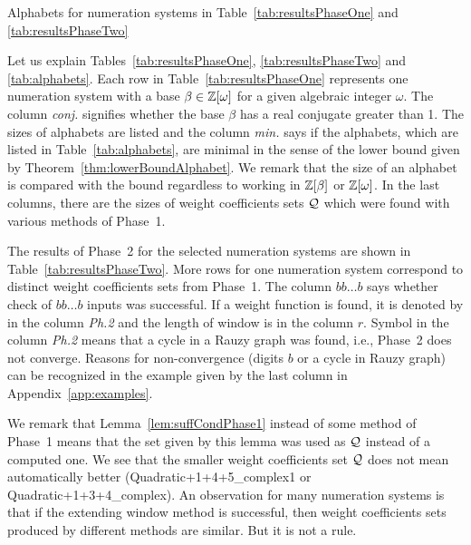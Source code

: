 \begin{table}[htb]
	\begin{center}
	
	\end{center}
\caption{Alphabets for numeration systems in Table~\ref{tab:resultsPhaseOne} and \ref{tab:resultsPhaseTwo}}
\label{tab:alphabets}
\end{table}





Let us explain Tables~\ref{tab:resultsPhaseOne}, \ref{tab:resultsPhaseTwo} and \ref{tab:alphabets}. Each row in Table~\ref{tab:resultsPhaseOne} represents one numeration system with a base $\beta\in\mathbb{Z}[\omega]$ for a given algebraic integer $\omega$. The column \emph{conj.} signifies whether the base $\beta$ has a real conjugate greater than 1. The sizes of alphabets are listed and the column \emph{min.} says if the alphabets, which are listed in Table~\ref{tab:alphabets}, are minimal in the sense of the lower bound given by Theorem~\ref{thm:lowerBoundAlphabet}.  We remark that the size of an alphabet is compared with the bound regardless to working in $\mathbb{Z}[\beta]$ or $\mathbb{Z}[\omega]$. 
In the last columns, there are the sizes of weight coefficients sets $\mathcal{Q}$ which were found  with various methods of Phase~1.

The results of Phase~2 for the selected numeration systems are shown in Table~\ref{tab:resultsPhaseTwo}. More rows for one numeration system correspond to distinct weight coefficients sets from Phase~1. The column $bb\dots b$ says whether check of $bb\dots b$ inputs was successful. If a weight function is found, it is denoted by \checkmark{} in the column \emph{Ph.2} and the length of window is in the column $r$. Symbol \xmark{} in the column \emph{Ph.2} means that a cycle in a Rauzy graph was found, i.e., Phase~2 does not converge. Reasons for non-convergence (digits $b$ or a cycle in Rauzy graph) can be recognized in the  example given by the last column in Appendix~\ref{app:examples}.

We remark that Lemma~\ref{lem:suffCondPhase1} instead of some method of Phase~1 means that the set given by this lemma was used as $\mathcal{Q}$ instead of a computed one.  We see that the smaller weight coefficients set $\mathcal{Q}$ does not mean automatically better (Quadratic+1+4+5\_complex1 or Quadratic+1+3+4\_complex). An observation for many numeration systems is that if the extending window method is successful, then weight coefficients sets produced by different methods are similar. But it is not a rule. 

